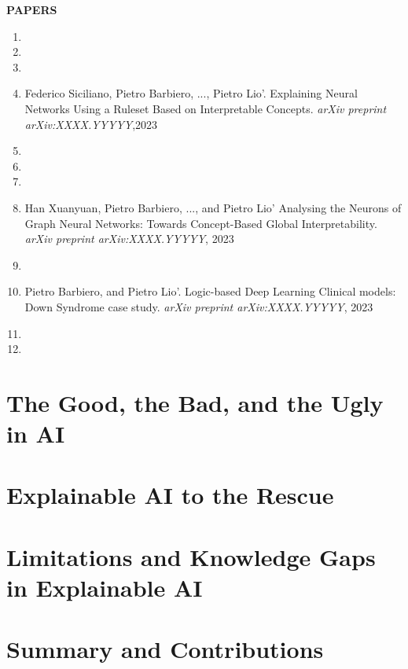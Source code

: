 \documentclass[withindex,glossary]{cam-thesis}
\theoremstyle{plain}
\theoremstyle{definition}
\theoremstyle{remark}
\begin{document}
\textbf{PAPERS}
\nobibliography*
\begin{enumerate}
    \item {}
    \item {}
    \item {}
    \item Federico Siciliano, Pietro Barbiero, ..., Pietro Lio'. Explaining Neural Networks Using a Ruleset Based on Interpretable Concepts. \textit{arXiv preprint arXiv:XXXX.YYYYY},2023
    \item {}
    \item {}
    \item {}
    \item Han Xuanyuan, Pietro Barbiero, ..., and Pietro Lio' Analysing the Neurons of Graph Neural Networks: Towards Concept-Based Global Interpretability. \textit{arXiv preprint arXiv:XXXX.YYYYY}, 2023
    \item {}
    \item Pietro Barbiero, and Pietro Lio'. Logic-based Deep Learning Clinical models: Down Syndrome case study. \textit{arXiv preprint arXiv:XXXX.YYYYY}, 2023
    \item {}
    \item {}
\end{enumerate}

\section{The Good, the Bad, and the Ugly in AI}

\section{Explainable AI to the Rescue}

\section{Limitations and Knowledge Gaps in Explainable AI}

\section{Summary and Contributions}


\end{document}

